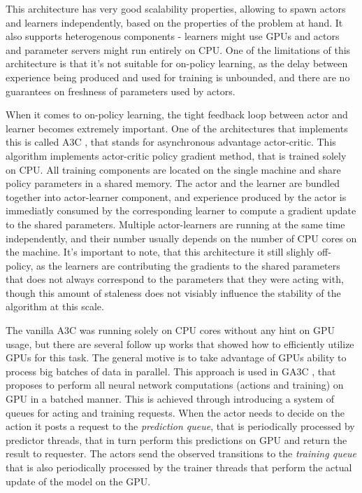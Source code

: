 This architecture has very good scalability properties, allowing to spawn actors and learners
independently, based on the properties of the problem at hand. It also supports heterogenous
components - learners might use GPUs and actors and parameter servers might run entirely on CPU.
One of the limitations of this architecture is that it's not suitable for on-policy learning,
as the delay between experience being produced and used for training is unbounded, and there
are no guarantees on freshness of parameters used by actors.

When it comes to on-policy learning, the tight feedback loop between actor and learner becomes
extremely important. One of the architectures that implements this is called A3C \cite{A3C}, that
stands for asynchronous advantage actor-critic. This algorithm implements actor-critic policy
gradient method, that is trained solely on CPU. All training components are located on the
single machine and share policy parameters in a shared memory. The actor and the learner are
bundled together into actor-learner component, and experience produced by the actor is immediatly
consumed by the corresponding learner to compute a gradient update to the shared parameters.
Multiple actor-learners are running at the same time independently, and their number usually
depends on the number of CPU cores on the machine. It's important to note, that this architecture
it still slighly off-policy, as the learners are contributing the gradients to the shared parameters
that does not always correspond to the parameters that they were acting with, though this amount
of staleness does not visiably influence the stability of the algorithm at this scale.

The vanilla A3C was running solely on CPU cores without any hint on GPU usage, but there are
several follow up works that showed how to efficiently utilize GPUs for this task. The general
motive is to take advantage of GPUs ability to process big batches of data in parallel.
This approach is used in GA3C \cite{GA3C}, that proposes to perform all neural network computations
(actions and training) on GPU in a batched manner. This is achieved through introducing a system
of queues for acting and training requests. When the actor needs to decide on the action it
posts a request to the \emph{prediction queue}, that is periodically processed by predictor threads,
that in turn perform this predictions on GPU and return the result to requester.
The actors send the observed transitions to the \emph{training queue} that is also periodically
processed by the trainer threads that perform the actual update of the model on the GPU.

